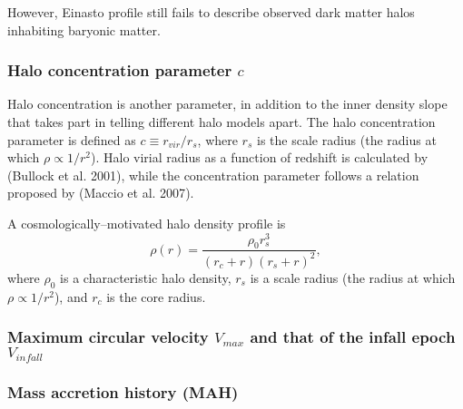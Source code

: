 \documentclass[paper=a4, fontsize=11pt]{scrartcl} %
\numberwithin{equation}{section} %
\numberwithin{figure}{section} %
\numberwithin{table}{section} %
\begin{document}
However, Einasto profile still fails to describe observed dark matter halos inhabiting baryonic matter.   

\subsubsection*{Halo concentration parameter $c$}
Halo concentration is another parameter, in addition to the inner density slope that takes part in telling different halo models apart. The halo concentration parameter is defined as $c \equiv r_{vir}/r_s$, where $r_s$ is the scale radius (the radius at which $\rho \propto 1/r^2$). Halo virial radius as a function of redshift is calculated by ({Bullock et al. 2001}), while the concentration parameter follows a relation proposed by ({Maccio et al. 2007}).

A cosmologically--motivated halo density profile is
\begin{equation}
\rho(r) = \frac{\rho_0 r_s^3}{(r_c + r)(r_s + r)^2},
\end{equation}
where $\rho_0$ is a characteristic halo density, $r_s$ is a scale radius (the radius at which $\rho \propto 1/r^2$), and $r_c$ is the core radius. 

\subsubsection*{Maximum circular velocity $V_{max}$ and that of the infall epoch $V_{infall}$}
\subsubsection*{Mass accretion history (MAH)}
\end{document}

